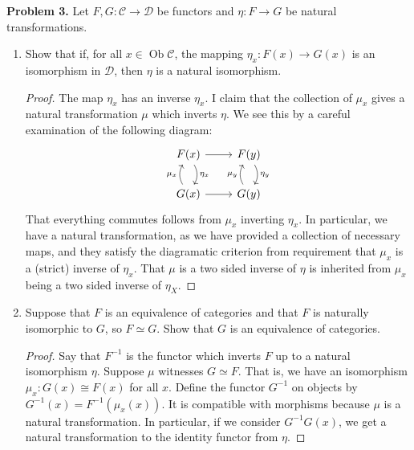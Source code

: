 \documentclass[reqno]{amsart}
\DeclareMathOperator{\Ob}{Ob}
\theoremstyle{definition}
\theoremstyle{remark}
\newcommand{\prob}[1] {
  \textbf{Problem #1.}
}
\begin{document}
\prob{3} Let $F, G : \mathcal{C} \to \mathcal{D}$ be functors and $\eta : F \to
G$ be natural transformations.

\begin{enumerate}
  \item Show that if, for all $x \in \Ob \mathcal{C}$, the mapping $\eta_x :
    F(x) \to G(x)$ is an isomorphism in $\mathcal{D}$, then $\eta$ is a natural
    isomorphism.

    \begin{proof}
      The map $\eta_x$ has an inverse $\eta_x$. I claim that the collection of
      $\mu_x$ gives a natural transformation $\mu$ which inverts $\eta$. We
      see this by a careful examination of the following diagram:
      \[
        \begin{tikzcd}
          F(x) \ar[r] \ar[d, bend left, "\eta_x"] & F(y) \ar[d, bend left,
          "\eta_y"] \\
          G(x) \ar[r] \ar[u, bend left, "\mu_x"] & G(y) \ar[u, bend left,
          "\mu_y"]
        \end{tikzcd}
      \]
      That everything commutes follows from $\mu_x$ inverting $\eta_x$. In
      particular, we have a natural transformation, as we have provided a
      collection of necessary maps, and they satisfy the diagramatic criterion
      from requirement that $\mu_x$ is a (strict) inverse of $\eta_x$. That
      $\mu$ is a two sided inverse of $\eta$ is inherited from $\mu_x$ being a two
      sided inverse of $\eta_X$.
    \end{proof}

  \item Suppose that $F$ is an equivalence of categories and that $F$ is
    naturally isomorphic to $G$, so $F \simeq G$. Show that $G$ is an
    equivalence of categories.

    \begin{proof}
      Say that $F^{-1}$ is the functor which inverts $F$ up to a natural
      isomorphism $\eta$. Suppose $\mu$ witnesses $G \simeq F$. That is, we have
      an isomorphism $\mu_x : G(x) \cong F(x)$ for all $x$. Define the functor
      $G^{-1}$ on objects by $G^{-1}(x) = F^{-1}(\mu_x(x))$. It is compatible
      with morphisms because $\mu$ is a natural transformation. In particular,
      if we consider $G^{-1}G(x)$, we get a natural transformation to the
      identity functor from $\eta$.
    \end{proof}
\end{enumerate}
\end{document}

